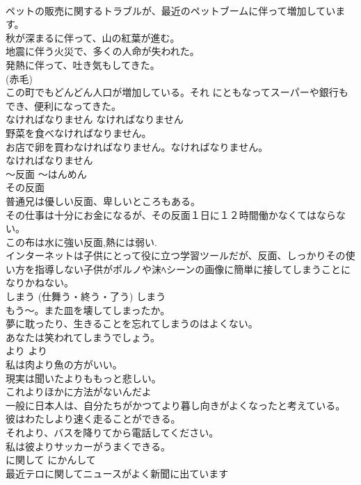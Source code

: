 \documentclass[8pt]{extreport}
\begin{document}
\begin{CJK}{UTF8}{min}
\\	ペットの販売に関するトラブルが、最近のペットブームに伴って増加しています。  
\\	秋が深まるに伴って、山の紅葉が進む。   
\\	地震に伴う火災で、多くの人命が失われた。  
\\	発熱に伴って、吐き気もしてきた。  
\\	(赤毛)
\\	この町でもどんどん人口が増加している。それ にともなってスーパーや銀行もでき、便利になってきた。  
\\	なければなりません	なければなりません	
\\	野菜を食べなければなりません。   
\\	お店で卵を買わなければなりません。なければなりません。  
\\	なければなりません 
\\	〜反面	〜はんめん	
\\	その反面  
\\	普通兄は優しい反面、卑しいところもある。  
\\	その仕事は十分にお金になるが、その反面１日に１２時間働かなくてはならない。   
\\	この布は水に強い反面,熱には弱い.  
\\	インターネットは子供にとって役に立つ学習ツールだが、反面、しっかりその使い方を指導しない子供がポルノや沫ﾍシーンの画像に簡単に接してしまうことになりかねない。  
\\	しまう (仕舞う・終う・了う)	しまう	
\\	もう〜。また皿を壊してしまったか。  
\\	夢に耽ったり、生きることを忘れてしまうのはよくない。  
\\	あなたは笑われてしまうでしょう。  
\\	より	より	
\\	私は肉より魚の方がいい。  
\\	現実は聞いたよりももっと悲しい。  
\\	これよりほかに方法がないんだよ  
\\	一般に日本人は、自分たちがかつてより暮し向きがよくなったと考えている。  
\\	彼はわたしより速く走ることができる。  
\\	それより、バスを降りてから電話してください。  
\\	私は彼よりサッカーがうまくできる。  
\\	に関して	にかんして	
\\	最近テロに関してニュースがよく新聞に出ています   

\end{CJK}
\end{document}
